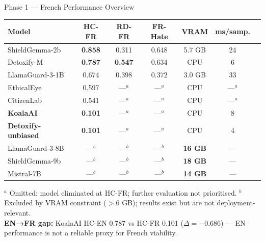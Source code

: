 \documentclass[aspectratio=169, 12pt]{beamer}
\newcommand{\good}[1]{\textcolor{okgreen}{\textbf{#1}}}
\newcommand{\bad}[1]{\textcolor{warnred}{\textbf{#1}}}
\begin{document}
\begin{frame}[shrink=25]{Phase 1 — French Performance Overview}
  \scriptsize
  \begin{table}
    \centering
    \begin{tabular}{lcccccc}
      \toprule
      \textbf{Model} & \textbf{HC-FR} & \textbf{RD-FR} & \textbf{FR-Hate} & \textbf{VRAM} & \textbf{ms/samp.} \\
      \midrule
      \rowcolor{lightgray}
      ShieldGemma-2b      & \good{0.858} & 0.311        & 0.648 & 5.7 GB      & 24 \\
      Detoxify-M          & \good{0.787} & \good{0.547} & 0.634 & CPU         & 6  \\
      LlamaGuard-3-1B     & 0.674        & 0.398        & 0.372 & 3.0 GB      & 33 \\
      EthicalEye          & 0.597        & —$^a$        & —$^a$ & CPU         & —$^a$ \\
      CitizenLab          & 0.541        & —$^a$        & —$^a$ & CPU         & —$^a$ \\
      \midrule
      \bad{KoalaAI}           & \bad{0.101} & —$^a$ & —$^a$ & CPU         & 8  \\
      \bad{Detoxify-unbiased} & \bad{0.101} & —$^a$ & —$^a$ & CPU         & 4  \\
      \midrule
      LlamaGuard-3-8B     & —$^b$        & —$^b$        & —$^b$ & \bad{16 GB} & — \\
      ShieldGemma-9b      & —$^b$        & —$^b$        & —$^b$ & \bad{18 GB} & — \\
      Mistral-7B          & —$^b$        & —$^b$        & —$^b$ & \bad{14 GB} & — \\
      \bottomrule
    \end{tabular}
  \end{table}
  \vspace{2pt}
  \scriptsize
  $^a$ Omitted: model eliminated at HC-FR; further evaluation not prioritised.
  \quad $^b$ Excluded by VRAM constraint ($>$6 GB); results exist but are not deployment-relevant.\\[3pt]
  \small\textbf{EN→FR gap:} KoalaAI HC-EN 0.787 vs HC-FR 0.101 ($\Delta = -0.686$) —
  EN performance is not a reliable proxy for French viability.
\end{frame}
\end{document}
